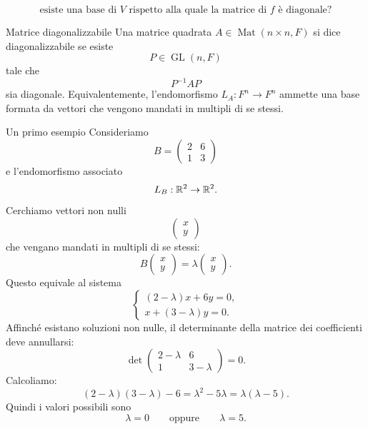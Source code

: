 \documentclass[a4paper]{article}
\begin{document}
\[
    \text{esiste una base di \(V\) rispetto alla quale la matrice di \(f\) è diagonale?}
\]

\begin{snippetdefinition}{Matrice diagonalizzabile}
    Una matrice quadrata \(A\in\operatorname{Mat}(n\times n,F)\) si dice diagonalizzabile se esiste
    \[
        P\in\operatorname{GL}(n,F)
    \]
    tale che
    \[
        P^{-1}AP
    \]
    sia diagonale.
    Equivalentemente, l'endomorfismo \(L_A:F^n\to F^n\) ammette una base formata da vettori che vengono mandati in multipli di se stessi.
\end{snippetdefinition}

\begin{snippetexample}{Un primo esempio}
    Consideriamo
    \[
        B=
        \begin{pmatrix}
            2 & 6\\
            1 & 3
        \end{pmatrix}
    \]
    e l'endomorfismo associato
    \[
        L_B:\mathbb{R}^2\to\mathbb{R}^2.
    \]
    Cerchiamo vettori non nulli
    \[
        \begin{pmatrix}
            x\\
            y
        \end{pmatrix}
    \]
    che vengano mandati in multipli di se stessi:
    \[
        B
        \begin{pmatrix}
            x\\
            y
        \end{pmatrix}
        =
        \lambda
        \begin{pmatrix}
            x\\
            y
        \end{pmatrix}.
    \]
    Questo equivale al sistema
    \[
        \begin{cases}
            (2-\lambda)x+6y=0,\\
            x+(3-\lambda)y=0.
        \end{cases}
    \]
    Affinché esistano soluzioni non nulle, il determinante della matrice dei coefficienti deve annullarsi:
    \[
        \det
        \begin{pmatrix}
            2-\lambda & 6\\
            1 & 3-\lambda
        \end{pmatrix}
        =
        0.
    \]
    Calcoliamo:
    \[
        (2-\lambda)(3-\lambda)-6
        =
        \lambda^2-5\lambda
        =
        \lambda(\lambda-5).
    \]
    Quindi i valori possibili sono
    \[
        \lambda=0
        \qquad
        \text{oppure}
        \qquad
        \lambda=5.
    \]


\end{snippetexample}
\end{document}
